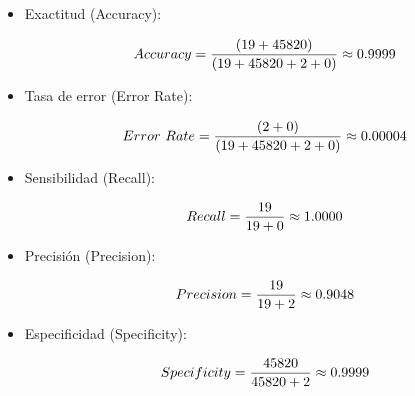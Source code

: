       \begin{itemize}
            \item  Exactitud (Accuracy):

                  \begin{align}
                        Accuracy = \frac{(19+45820)}{(19+45820+2+0)}\approx 0.9999 \notag \\
                        \label{eq:accuracy_optimized}
                  \end{align}
            \item Tasa de error (Error Rate):

                  \begin{align}
                        Error\ Rate = \frac{(2+0)}{(19+45820+2+0)}\approx 0.00004 \notag \\
                        \label{eq:error_rate_optimized}
                  \end{align}
            \item Sensibilidad (Recall):

                  \begin{align}
                        Recall = \frac{19}{19+0}\approx 1.0000 \notag \\
                        \label{eq:recall_optimized}
                  \end{align}
            \item Precisión (Precision): 

                  \begin{align}
                        Precision = \frac{19}{19+2}\approx 0.9048 \notag \\
                        \label{eq:precision_optimized}
                  \end{align}
            \item Especificidad (Specificity): 

                  \begin{align}
                        Specificity = \frac{45820}{45820+2}\approx 0.9999 \notag \\
                        \label{eq:specificity_optimized}
                  \end{align}
      \end{itemize}

